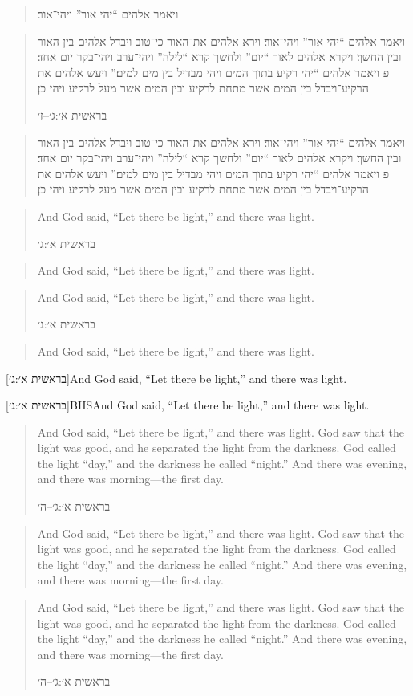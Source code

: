 \documentclass[12pt]{article}
\begin{document}
\blockcquote[בראשית א׳:ג׳]{BHS}{ויאמר אלהים \enquote{יהי אור} ויהי־אור׃}

\blockquote[בראשית א׳:ג׳–ז׳]{ויאמר אלהים \enquote{יהי אור} ויהי־אור׃ וירא
אלהים את־האור כי־טוב ויבדל אלהים בין האור ובין החשך׃ ויקרא אלהים לאור
\enquote{יום} ולחשך קרא \enquote{לילה} ויהי־ערב ויהי־בקר יום אחד׃ פ ויאמר
אלהים \enquote{יהי רקיע בתוך המים ויהי מבדיל בין מים למים׃} ויעש אלהים את
הרקיע־ויבדל בין המים אשר מתחת לרקיע ובין המים אשר מעל לרקיע ויהי כן׃}

\blockcquote[בראשית א׳:ג׳–ז׳]{BHS}{ויאמר אלהים \enquote{יהי אור} ויהי־אור׃
וירא אלהים את־האור כי־טוב ויבדל אלהים בין האור ובין החשך׃ ויקרא אלהים לאור
\enquote{יום} ולחשך קרא \enquote{לילה} ויהי־ערב ויהי־בקר יום אחד׃ פ ויאמר
אלהים \enquote{יהי רקיע בתוך המים ויהי מבדיל בין מים למים׃} ויעש אלהים את
הרקיע־ויבדל בין המים אשר מתחת לרקיע ובין המים אשר מעל לרקיע ויהי כן׃}

\foreignblockquote{english}[בראשית א׳:ג׳]{And God said, \enquote{Let there be
light,} and there was light.}

\foreignblockcquote{english}[בראשית א׳:ג׳]{BHS}{And God said, \enquote{Let
there be light,} and there was light.}

\hyphenblockquote{english}[בראשית א׳:ג׳]{And God said, \enquote{Let there be
light,} and there was light.}

\hyphenblockcquote{english}[בראשית א׳:ג׳]{BHS}{And God said, \enquote{Let
there be light,} and there was light.}

[בראשית א׳:ג׳]{And God said, \enquote{Let there be
light,} and there was light.}

[בראשית א׳:ג׳]{BHS}{And God said, \enquote{Let
there be light,} and there was light.}

\foreignblockquote{english}[בראשית א׳:ג׳–ה׳]{And God said, \enquote{Let there be
light,} and there was light. God saw that the light was good, and he separated
the light from the darkness. God called the light \enquote{day,} and the
darkness he called \enquote{night.} And there was evening, and there was
morning—the first day.}

\foreignblockcquote{english}[בראשית א׳:ג׳–ה׳]{BHS}{And God said, \enquote{Let
there be light,} and there was light. God saw that the light was good, and he
separated the light from the darkness. God called the light \enquote{day,} and
the darkness he called \enquote{night.} And there was evening, and there was
morning—the first day.}

\hyphenblockquote{english}[בראשית א׳:ג׳–ה׳]{And God said, \enquote{Let there
be light,} and there was light. God saw that the light was good, and he
separated the light from the darkness. God called the light \enquote{day,} and
the darkness he called \enquote{night.} And there was evening, and there was
morning—the first day.}
\end{document}

